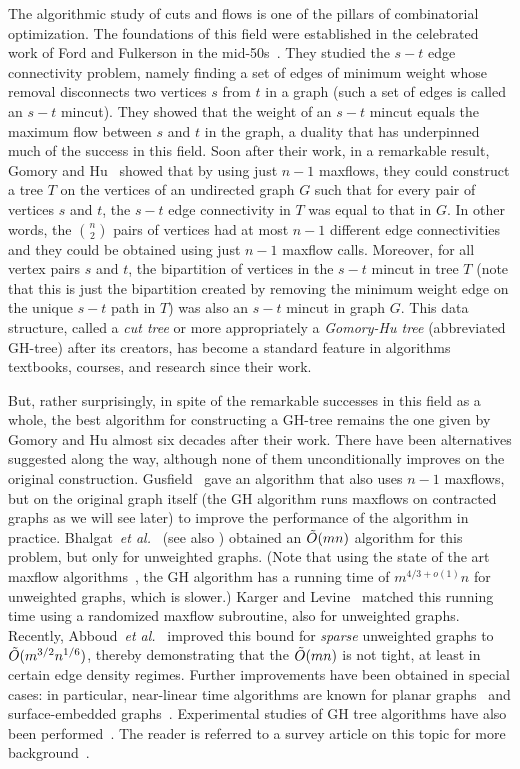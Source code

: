 The algorithmic study of cuts and flows is one of the pillars of combinatorial optimization. The foundations of this field were established 
in the celebrated work of Ford and Fulkerson in the mid-50s~\cite{FordF56}. They studied the $s-t$ edge connectivity problem, namely finding a set of edges of minimum weight whose removal disconnects two vertices $s$ from $t$ in a graph (such a set of edges is called an $s-t$ mincut). They showed that the weight of an $s-t$ mincut equals the maximum flow between $s$ and $t$ in the graph, a duality that has underpinned much of the success in this field. Soon after their work, in a remarkable result, Gomory and Hu~\cite{GomoryH61} showed that by using just $n-1$ maxflows, they could construct a tree $T$ on the vertices of an undirected graph $G$ such that for every pair of vertices $s$ and $t$, the $s-t$ edge connectivity in $T$ was equal to that in $G$. In other words, the $n\choose 2$ pairs of vertices had at most $n-1$ different edge connectivities and they could be obtained using just $n-1$ maxflow calls. Moreover, for all vertex pairs $s$ and $t$, the bipartition of vertices in the $s-t$ mincut in tree $T$ (note that this is just the bipartition created by removing the minimum weight edge on the unique $s-t$ path in $T$) was also an $s-t$ mincut in graph $G$. This data structure, called a {\em cut tree} or more appropriately a {\em Gomory-Hu tree} (abbreviated GH-tree) after its creators, has become a standard feature in algorithms textbooks, courses, and research since their work.

But, rather surprisingly, in spite of the remarkable successes in this field as a whole, the best algorithm for constructing a GH-tree remains the one given by Gomory and Hu almost six decades after their work. There have been alternatives suggested along the way, although none of them unconditionally improves on the original construction. Gusfield~\cite{Gusfield90} gave an algorithm that also uses $n-1$ maxflows, but on the original graph itself (the GH algorithm runs maxflows on contracted graphs as we will see later) to improve the performance of the algorithm in practice. Bhalgat~{\em et al.}~\cite{BhalgatHKP08} (see also \cite{HariharanKP07}) obtained an $\tilde{O}(mn)$ algorithm for this problem, but only for unweighted graphs. (Note that using the state of the art maxflow algorithms~\cite{liu2020faster}, the GH algorithm has a running time of $m^{4/3+o(1)}n$ for unweighted graphs, which is slower.) Karger and Levine~\cite{KargerL15} matched this running time using a randomized maxflow subroutine, also for unweighted graphs. Recently, Abboud~{\em et al.}~\cite{AbboudKT20a} improved this bound for {\em sparse} unweighted graphs to $\tilde{O}(m^{3/2}n^{1/6})$, thereby demonstrating that the $\tilde{O}(mn)$ is not tight, at least in certain edge density regimes. Further improvements have been obtained in special cases: in particular, near-linear time algorithms are known for planar graphs~\cite{BorradaileSW15} and surface-embedded graphs~\cite{BorradaileENW16}. Experimental studies of GH tree algorithms have also been performed~\cite{GoldbergT01}. The reader is referred to a survey article on this topic for more background~\cite{Panigrahi16}.

